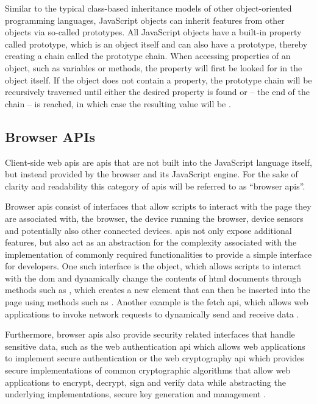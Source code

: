 Similar to the typical class-based inheritance models of other object-oriented programming languages, JavaScript objects can inherit features from other objects via so-called prototypes. All JavaScript objects have a built-in property called prototype, which is an object itself and can also have a prototype, thereby creating a chain called the prototype chain. When accessing properties of an object, such as variables or methods, the property will first be looked for in the object itself. If the object does not contain a property, the prototype chain will be recursively traversed until either the desired property is found or  – the end of the chain – is reached, in which case the resulting value will be . \cite{ECMA262_edition6, MozObjectPrototypes}



\subsection{Browser APIs}
\label{sec.browserAPIs}

Client-side web \acsp{api} are \acp{api} that are not built into the JavaScript language itself, but instead provided by the browser and its JavaScript engine. For the sake of clarity and readability this category of \acp{api} will be referred to as “browser \acsp{api}”.

Browser \acsp{api} consist of interfaces that allow scripts to interact with the page they are associated with, the browser, the device running the browser, device sensors and potentially also other connected devices. \acsp{api} not only expose additional features, but also act as an abstraction for the complexity associated with the implementation of commonly required functionalities to provide a simple interface for developers. \cite{MozWebAPIs}
One such interface is the  object, which allows scripts to interact with the \ac{dom} and dynamically change the contents of \acs{html} documents through methods such as , which creates a new element that can then be inserted into the page using methods such as  \cite{dom}. Another example is the fetch \acs{api}, which allows web applications to invoke network requests to dynamically send and receive data \cite{fetch}.

Furthermore, browser \acsp{api} also provide security related interfaces that handle sensitive data, such as the web authentication \acs{api} which allows web applications to implement secure authentication \cite{webauthn} or the web cryptography \acs{api} which provides secure implementations of common cryptographic algorithms that allow web applications to encrypt, decrypt, sign and verify data while abstracting the underlying implementations, secure key generation and management \cite{crypto}.

